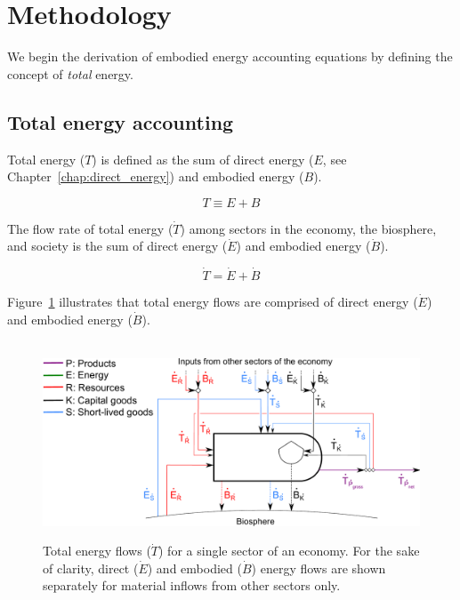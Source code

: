 \section{Methodology}
\label{sec:embodied_methodology}

We begin the derivation of embodied energy accounting
equations by defining the concept of 
\emph{total} energy. 


\subsection{Total energy accounting}
\label{sec:total_energy_accounting}

Total energy ($T$)
is defined as the sum of 
direct energy 
($E$, see Chapter~\ref{chap:direct_energy}) 
and embodied energy ($B$).

\begin{equation} \label{eq:T_def}
	T \equiv E + B
\end{equation}

The flow rate of total energy 
($\dot{T}$) among sectors in 
the economy, the biosphere, and society is the sum of
direct energy ($\dot{E}$) and embodied 
energy ($\dot{B}$).

\begin{equation} \label{eq:T_dot_def}
	\dot{T} = \dot{E} + \dot{B}
\end{equation}

\noindent Figure~\ref{fig:embodied_single_producer} illustrates
that total energy flows are comprised of
direct energy ($\dot{E}$) and embodied energy ($\dot{B}$). 

\begin{figure}[!ht]
	\centering\
	\includegraphics[width=.9\textwidth]{Part_1/Chapter_Embodied/images/PERKS_basic_unit_embodied_energy_content.pdf}
	\caption[Total energy flows for a single sector]{Total energy flows 
	($\dot{T}$) for a single sector of an economy. 
	For the sake of clarity, 
	direct ($\dot{E}$) and embodied ($\dot{B}$) energy flows
	are shown separately for material inflows from other sectors only.
}
\label{fig:embodied_single_producer}
\end{figure}

